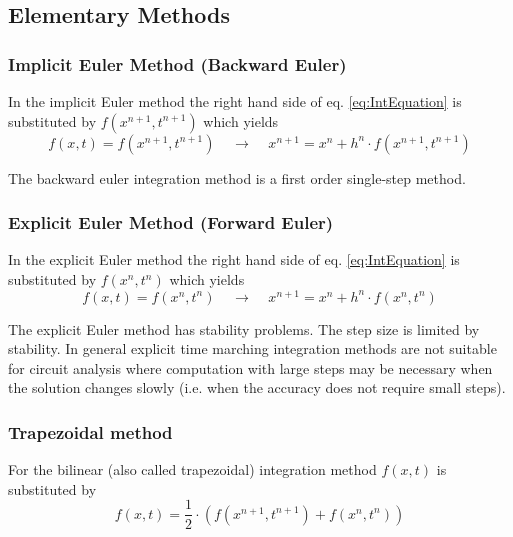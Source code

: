 \subsection{Elementary Methods}

\subsubsection{Implicit Euler Method (Backward Euler)}

In the implicit Euler method the right hand side of
eq. \eqref{eq:IntEquation} is substituted by $f(x^{n+1}, t^{n+1})$
which yields
\begin{equation}
\label{eq:BEInt}
f(x,t) = f(x^{n+1}, t^{n+1})
\;\;\;\; \rightarrow \;\;\;\;
x^{n+1} = x^n + h^n\cdot f(x^{n+1}, t^{n+1})
\end{equation}

The backward euler integration method is a first order single-step
method.

\subsubsection{Explicit Euler Method (Forward Euler)}

In the explicit Euler method the right hand side of
eq. \eqref{eq:IntEquation} is substituted by $f(x^{n}, t^{n})$ which
yields
\begin{equation}
f(x,t) = f(x^n, t^n)
\;\;\;\; \rightarrow \;\;\;\;
x^{n+1} = x^n + h^n\cdot f(x^n, t^n)
\end{equation}

The explicit Euler method has stability problems.  The step size is
limited by stability.  In general explicit time marching integration
methods are not suitable for circuit analysis where computation with
large steps may be necessary when the solution changes slowly
(i.e. when the accuracy does not require small steps).

\subsubsection{Trapezoidal method}

For the bilinear (also called trapezoidal) integration method $f(x,t)$
is substituted by
\begin{equation}
f(x,t) = \dfrac{1}{2}\cdot \left(f(x^{n+1}, t^{n+1}) + f(x^{n}, t^{n})\right)
\end{equation}

